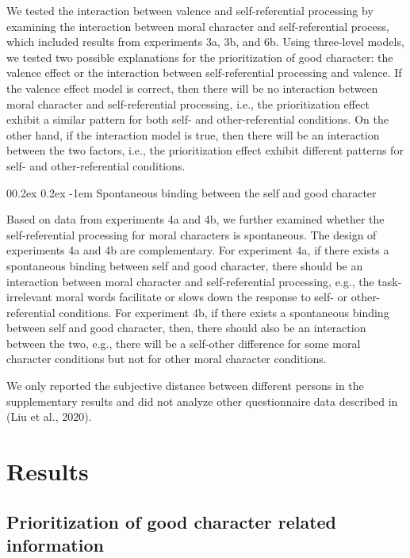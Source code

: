 \documentclass[
  man]{apa6}
\makeatletter
\let\oldparagraph\paragraph
\renewcommand{\paragraph}[1]{\oldparagraph{#1}\mbox{}}
\renewcommand{\paragraph}{\@startsection{paragraph}{4}{\parindent}%
  {0\baselineskip \@plus 0.2ex \@minus 0.2ex}%
  {-1em}%
  {\normalfont\normalsize\bfseries\itshape\typesectitle}}
\makeatother
\begin{document}
We tested the interaction between valence and self-referential processing by examining the interaction between moral character and self-referential process, which included results from experiments 3a, 3b, and 6b. Using three-level models, we tested two possible explanations for the prioritization of good character: the valence effect or the interaction between self-referential processing and valence. If the valence effect model is correct, then there will be no interaction between moral character and self-referential processing, i.e., the prioritization effect exhibit a similar pattern for both self- and other-referential conditions. On the other hand, if the interaction model is true, then there will be an interaction between the two factors, i.e., the prioritization effect exhibit different patterns for self- and other-referential conditions.

\hypertarget{spontaneous-binding-between-the-self-and-good-character}{%
\paragraph{Spontaneous binding between the self and good character}\label{spontaneous-binding-between-the-self-and-good-character}}

Based on data from experiments 4a and 4b, we further examined whether the self-referential processing for moral characters is spontaneous. The design of experiments 4a and 4b are complementary. For experiment 4a, if there exists a spontaneous binding between self and good character, there should be an interaction between moral character and self-referential processing, e.g., the task-irrelevant moral words facilitate or slows down the response to self- or other-referential conditions. For experiment 4b, if there exists a spontaneous binding between self and good character, then, there should also be an interaction between the two, e.g., there will be a self-other difference for some moral character conditions but not for other moral character conditions.

We only reported the subjective distance between different persons in the supplementary results and did not analyze other questionnaire data described in (Liu et al., 2020).

\hypertarget{results}{%
\section{Results}\label{results}}

\hypertarget{prioritization-of-good-character-related-information}{%
\subsection{Prioritization of good character related information}\label{prioritization-of-good-character-related-information}}
\end{document}
